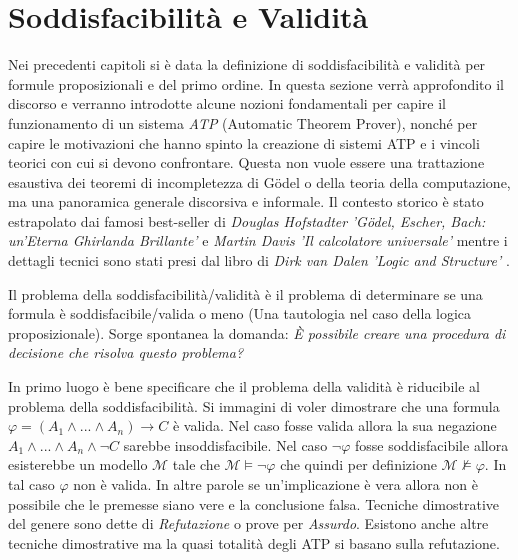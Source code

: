 \documentclass[./main.tex]{subfiles}
\begin{document}
\section{Soddisfacibilità e Validità} \label{sec:sat_val}
Nei precedenti capitoli si è data la definizione di soddisfacibilità e validità per formule proposizionali e del primo ordine.
In questa sezione verrà approfondito il discorso e verranno introdotte alcune nozioni fondamentali per 
capire il funzionamento di un sistema \textit{ATP} (Automatic Theorem Prover), nonché 
per capire le motivazioni che hanno spinto la creazione di sistemi ATP e i vincoli teorici con cui si devono confrontare.
Questa non vuole essere una trattazione esaustiva dei teoremi di incompletezza di Gödel o
della teoria della computazione,
ma una panoramica generale discorsiva e informale.
Il contesto storico è stato estrapolato dai famosi best-seller 
di \textit{Douglas Hofstadter} \textit{'Gödel, Escher, Bach: un'Eterna Ghirlanda Brillante'} \cite{hofstader_Godel_Escher_Bach}
e \textit{Martin Davis} \textit{'Il calcolatore universale'} \cite{davisCalcolatoreUniversale}
mentre i dettagli tecnici sono stati presi dal libro di \textit{Dirk van Dalen} \textit{'Logic and Structure'} \cite{LogicAndStructure}.



Il problema della soddisfacibilità/validità è il problema di determinare 
se una formula è soddisfacibile/valida o meno (Una tautologia nel caso della logica proposizionale).
Sorge spontanea la domanda: \textit{È possibile creare una procedura di decisione che risolva questo problema?} 

In primo luogo è bene specificare che il problema della validità è riducibile al problema della soddisfacibilità.
Si immagini di voler dimostrare che una formula $\varphi = (A_1 \land ... \land A_n) \rightarrow C$ è valida.
Nel caso fosse valida allora la sua negazione $A_1 \land ... \land A_n \land \lnot C$ sarebbe insoddisfacibile.
Nel caso $\lnot \varphi$ fosse soddisfacibile allora esisterebbe
 un modello $\mathcal{M}$ tale che $\mathcal{M} \models \lnot \varphi$ che quindi per definizione 
$\mathcal{M} \not\models \varphi$. In tal caso $\varphi$ non è valida.
In altre parole se un'implicazione è vera allora non è possibile che le premesse siano vere e la conclusione falsa.
Tecniche dimostrative del genere sono dette di \textit{Refutazione} o prove per \textit{Assurdo}.
Esistono anche altre tecniche dimostrative ma la quasi totalità degli ATP si basano sulla refutazione.
\end{document}
